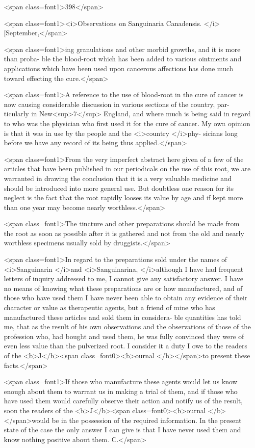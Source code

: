 <span class=font1>398</span>

<span class=font1><i>Observations on Sanguinaria Canadensis. </i>[September,</span>

<span class=font1>ing granulations and other morbid growths, and it is more than proba-
ble the blood-root which has been added to various ointments and
applications which have been used upon cancerous affections has done
much toward effecting the cure.</span>

<span class=font1>A reference to the use of blood-root in the cure of cancer is now
causing considerable discussion in various sections of the country, par-
ticularly in New<sup>7</sup> England, and where much is being said in regard to
who was the physician who first used it for the cure of cancer. My
own opinion is that it was in use by the people and the <i>country </i>phy-
sicians long before we have any record of its being thus applied.</span>

<span class=font1>From the very imperfect abstract here given of a few of the articles
that have been published in our periodicals on the use of this root, we are
warranted in drawing the conclusion that it is a very valuable medicine
and should be introduced into more general use. But doubtless one
reason for its neglect is the fact that the root rapidly looses its value by
age and if kept more than one year may become nearly worthless.</span>

<span class=font1>The tincture and other preparations should be made from the root as
soon as possible after it is gathered and not from the old and nearly
worthless specimens usually sold by druggists.</span>

<span class=font1>In regard to the preparations sold under the names of <i>Sanguinarin
</i>and <i>Sanguinarina, </i>although I have had frequent letters of inquiry
addressed to me, I cannot give any satisfactory answer. I have no
means of knowing what these preparations are or how manufactured,
and of those who have used them I have never been able to obtain any
evidence of their character or value as therapeutic agents, but a friend
of mine who has manufactured these articles and sold them in considera-
ble quantities has told me, that as the result of his own observations
and the observations of those of the profession who, had bought and
used them, he was fully convinced they were of even less value than
the pulverized root. I consider it a duty I owe to the readers of the
<b>J</b><span class=font0><b>ournal </b></span>to present these facts.</span>

<span class=font1>If those who manufacture these agents would let us know enough
about them to warrant us in making a trial of them, and if those who
have used them would carefully observe their action and notify us of
the result, soon the readers of the <b>J</b><span class=font0><b>ournal </b></span>would be in the possession
of the required information. In the present state of the case the only
answer I can give is that I have never used them and know nothing
positive about them. C.</span>\endinput

